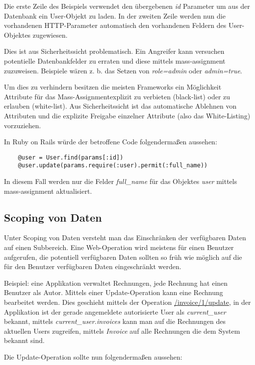 Die erste Zeile des Beispiels verwendet den übergebenen \textit{id} Parameter um aus der Datenbank ein User-Objekt zu laden. In der zweiten Zeile werden nun die vorhandenen HTTP-Parameter automatisch den vorhandenen Feldern des User-Objektes zugewiesen.

Dies ist aus Sicherheitssicht problematisch. Ein Angreifer kann versuchen potentielle Datenbankfelder zu erraten und diese mittels mass-assignment zuzuweisen. Beispiele wären z. b. das Setzen von \textit{role=admin} oder \textit{admin=true}.

Um dies zu verhindern besitzen die meisten Frameworks ein Möglichkeit Attribute für das Mass-Assignmentexplizit zu verbieten (black-list) oder zu erlauben (white-list). Aus Sicherheitssicht ist das automatische Ablehnen von Attributen und die explizite Freigabe einzelner Attribute (also das White-Listing) vorzuziehen.

In Ruby on Rails würde der betroffene Code folgendermaßen aussehen:

\begin{verbatim}
	@user = User.find(params[:id])
	@user.update(params.require(:user).permit(:full_name))
\end{verbatim}

In diesem Fall werden nur die Felder \textit{full\_name} für das Objektes \textit{user} mittels mass-assignment aktualisiert.

\subsection{Scoping von Daten}

Unter Scoping von Daten versteht man das Einschränken der verfügbaren Daten auf einen Subbereich. Eine Web-Operation wird meistens für einen Benutzer aufgerufen, die potentiell verfügbaren Daten sollten so früh wie möglich auf die für den Benutzer verfügbaren Daten eingeschränkt werden.

Beispiel: eine Applikation verwaltet Rechnungen, jede Rechnung hat einen Benutzer als Autor. Mittels einer Update-Operation kann eine Rechnung bearbeitet werden. Dies geschieht mittels der Operation \url{/invoice/1/update}, in der Applikation ist der gerade angemeldete autorisierte User als \textit{current\_user} bekannt, mittels \textit{current\_user.invoices} kann man auf die Rechnungen des aktuellen Users zugreifen, mittels \textit{Invoice} auf alle Rechnungen die dem System bekannt sind.

Die Update-Operation sollte nun folgendermaßen aussehen:

